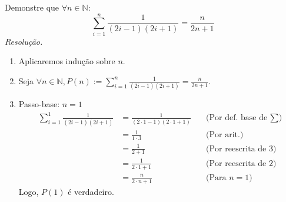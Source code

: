 Demonstre que $\forall n \in \mathbb{N}$:
\begin{displaymath}
	\sum\limits_{i=1}^n \frac{1}{(2i - 1) (2i + 1)} = \frac{n}{2n + 1}
\end{displaymath}
\emph{Resolução.}
\begin{enumerate}
	\item Aplicaremos indução sobre $n$.
	\item Seja $\forall n \in \mathbb{N}, P(n) := \sum\limits_{i=1}^n \frac{1}{(2i - 1) (2i + 1)} = \frac{n}{2n + 1}$.
	\item Passo-base: $n = 1$
	\begin{align*}
		\sum\limits_{i=1}^1 \frac{1}{(2i - 1) (2i + 1)} 
		&= \frac{1}{(2\cdot1 - 1) (2\cdot1 + 1)} &\quad \text{(Por def. base de $\sum$)} \\
		&= \frac{1}{1 \cdot 3} &\quad \text{(Por arit.)} \\
		&= \frac{1}{2 + 1} &\quad \text{(Por reescrita de 3)} \\
		&= \frac{1}{2 \cdot 1 + 1} &\quad \text{(Por reescrita de 2)} \\
		&= \frac{n}{2 \cdot n + 1} &\quad \text{(Para $n = 1$)}
	\end{align*}
	Logo, $P(1)$ é verdadeiro.
\end{enumerate}
